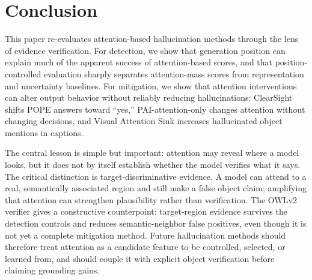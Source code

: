 \section{Conclusion}

This paper re-evaluates attention-based hallucination methods through the lens of evidence verification. For detection, we show that generation position can explain much of the apparent success of attention-based scores, and that position-controlled evaluation sharply separates attention-mass scores from representation and uncertainty baselines. For mitigation, we show that attention interventions can alter output behavior without reliably reducing hallucinations: ClearSight shifts POPE answers toward ``yes,'' PAI-attention-only changes attention without changing decisions, and Visual Attention Sink increases hallucinated object mentions in captions.

The central lesson is simple but important: attention may reveal where a model looks, but it does not by itself establish whether the model verifies what it says. The critical distinction is target-discriminative evidence. A model can attend to a real, semantically associated region and still make a false object claim; amplifying that attention can strengthen plausibility rather than verification. The OWLv2 verifier gives a constructive counterpoint: target-region evidence survives the detection controls and reduces semantic-neighbor false positives, even though it is not yet a complete mitigation method. Future hallucination methods should therefore treat attention as a candidate feature to be controlled, selected, or learned from, and should couple it with explicit object verification before claiming grounding gains.
